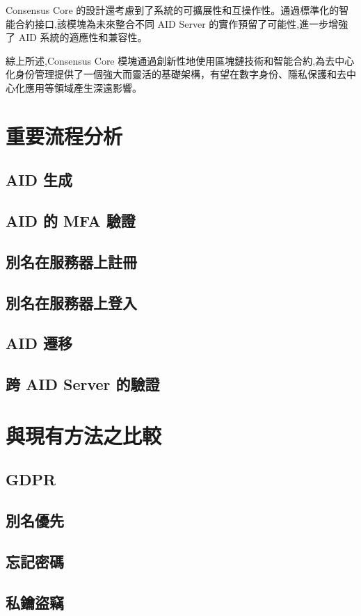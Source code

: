 Consensus Core 的設計還考慮到了系統的可擴展性和互操作性。通過標準化的智能合約接口,該模塊為未來整合不同 AID Server 的實作預留了可能性,進一步增強了 AID 系統的適應性和兼容性。

綜上所述,Consensus Core 模塊通過創新性地使用區塊鏈技術和智能合約,為去中心化身份管理提供了一個強大而靈活的基礎架構，有望在數字身份、隱私保護和去中心化應用等領域產生深遠影響。

\section{重要流程分析}
\subsection{AID 生成}
\subsection{AID 的 MFA 驗證}
\subsection{別名在服務器上註冊}
\subsection{別名在服務器上登入}
\subsection{AID 遷移}
\subsection{跨 AID Server 的驗證}

\section{與現有方法之比較}
\subsection{GDPR}
\subsection{別名優先}
\subsection{忘記密碼}
\subsection{私鑰盜竊}